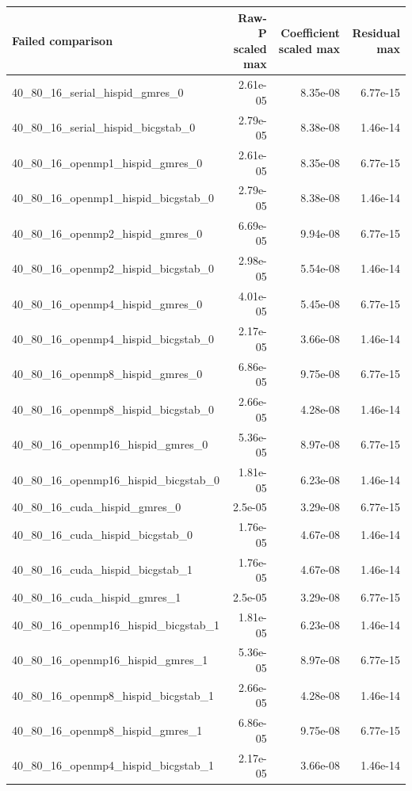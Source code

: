 \documentclass[11pt]{article}
\begin{document}
\small\begin{longtable}{lrrr}\toprule Failed comparison & Raw-P scaled max & Coefficient scaled max & Residual max\\\midrule\endhead
40\_80\_16\_serial\_hispid\_gmres\_0 & 2.61e-05 & 8.35e-08 & 6.77e-15\\
40\_80\_16\_serial\_hispid\_bicgstab\_0 & 2.79e-05 & 8.38e-08 & 1.46e-14\\
40\_80\_16\_openmp1\_hispid\_gmres\_0 & 2.61e-05 & 8.35e-08 & 6.77e-15\\
40\_80\_16\_openmp1\_hispid\_bicgstab\_0 & 2.79e-05 & 8.38e-08 & 1.46e-14\\
40\_80\_16\_openmp2\_hispid\_gmres\_0 & 6.69e-05 & 9.94e-08 & 6.77e-15\\
40\_80\_16\_openmp2\_hispid\_bicgstab\_0 & 2.98e-05 & 5.54e-08 & 1.46e-14\\
40\_80\_16\_openmp4\_hispid\_gmres\_0 & 4.01e-05 & 5.45e-08 & 6.77e-15\\
40\_80\_16\_openmp4\_hispid\_bicgstab\_0 & 2.17e-05 & 3.66e-08 & 1.46e-14\\
40\_80\_16\_openmp8\_hispid\_gmres\_0 & 6.86e-05 & 9.75e-08 & 6.77e-15\\
40\_80\_16\_openmp8\_hispid\_bicgstab\_0 & 2.66e-05 & 4.28e-08 & 1.46e-14\\
40\_80\_16\_openmp16\_hispid\_gmres\_0 & 5.36e-05 & 8.97e-08 & 6.77e-15\\
40\_80\_16\_openmp16\_hispid\_bicgstab\_0 & 1.81e-05 & 6.23e-08 & 1.46e-14\\
40\_80\_16\_cuda\_hispid\_gmres\_0 & 2.5e-05 & 3.29e-08 & 6.77e-15\\
40\_80\_16\_cuda\_hispid\_bicgstab\_0 & 1.76e-05 & 4.67e-08 & 1.46e-14\\
40\_80\_16\_cuda\_hispid\_bicgstab\_1 & 1.76e-05 & 4.67e-08 & 1.46e-14\\
40\_80\_16\_cuda\_hispid\_gmres\_1 & 2.5e-05 & 3.29e-08 & 6.77e-15\\
40\_80\_16\_openmp16\_hispid\_bicgstab\_1 & 1.81e-05 & 6.23e-08 & 1.46e-14\\
40\_80\_16\_openmp16\_hispid\_gmres\_1 & 5.36e-05 & 8.97e-08 & 6.77e-15\\
40\_80\_16\_openmp8\_hispid\_bicgstab\_1 & 2.66e-05 & 4.28e-08 & 1.46e-14\\
40\_80\_16\_openmp8\_hispid\_gmres\_1 & 6.86e-05 & 9.75e-08 & 6.77e-15\\
40\_80\_16\_openmp4\_hispid\_bicgstab\_1 & 2.17e-05 & 3.66e-08 & 1.46e-14\\

\end{longtable}
\end{document}
